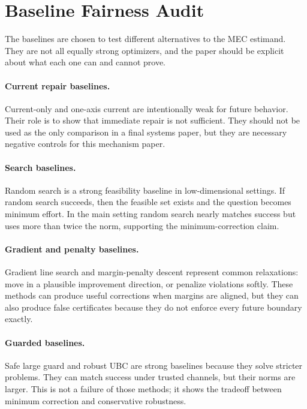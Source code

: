 \documentclass{article}
\begin{document}
\section{Baseline Fairness Audit}

The baselines are chosen to test different alternatives to the MEC estimand.
They are not all equally strong optimizers, and the paper should be explicit
about what each one can and cannot prove.

\paragraph{Current repair baselines.}
Current-only and one-axis current are intentionally weak for future behavior.
Their role is to show that immediate repair is not sufficient. They should not
be used as the only comparison in a final systems paper, but they are necessary
negative controls for this mechanism paper.

\paragraph{Search baselines.}
Random search is a strong feasibility baseline in low-dimensional settings. If
random search succeeds, then the feasible set exists and the question becomes
minimum effort. In the main setting random search nearly matches success but
uses more than twice the norm, supporting the minimum-correction claim.

\paragraph{Gradient and penalty baselines.}
Gradient line search and margin-penalty descent represent common relaxations:
move in a plausible improvement direction, or penalize violations softly. These
methods can produce useful corrections when margins are aligned, but they can
also produce false certificates because they do not enforce every future
boundary exactly.

\paragraph{Guarded baselines.}
Safe large guard and robust UBC are strong baselines because they solve stricter
problems. They can match success under trusted channels, but their norms are
larger. This is not a failure of those methods; it shows the tradeoff between
minimum correction and conservative robustness.
\end{document}
